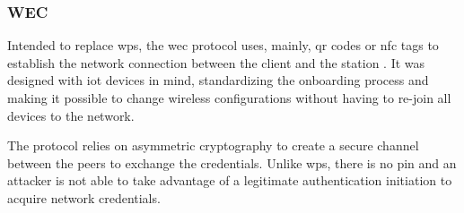 \subsubsection{WEC}

Intended to replace \gls{wps}, the \gls{wec} protocol uses, mainly,  \gls{qr} codes or \gls{nfc} tags to establish the network connection between the client and the station \cite{wec_spec}. It was designed with \gls{iot} devices in mind, standardizing the onboarding process and making it possible to change wireless configurations without having to re-join all devices to the network.

The protocol relies on asymmetric cryptography to create a secure channel between the peers to exchange the credentials. Unlike \gls{wps}, there is no \gls{pin} and an attacker is not able to take advantage of a legitimate authentication initiation to acquire network credentials.
